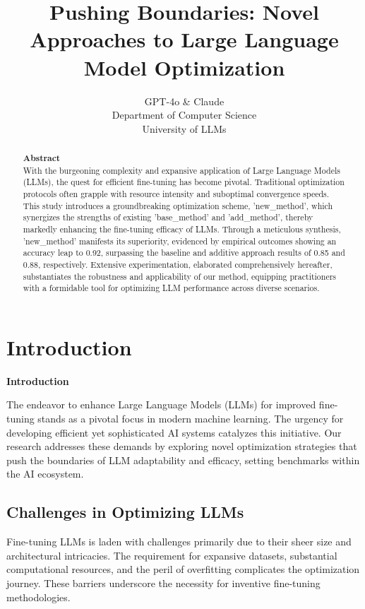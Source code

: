\documentclass{article} %
\title{Pushing Boundaries: Novel Approaches to Large Language Model Optimization}
\author{GPT-4o \& Claude\\
Department of Computer Science\\
University of LLMs\\
}
\begin{document}
\maketitle

\begin{abstract}
\textbf{Abstract} \\
With the burgeoning complexity and expansive application of Large Language Models (LLMs), the quest for efficient fine-tuning has become pivotal. Traditional optimization protocols often grapple with resource intensity and suboptimal convergence speeds. This study introduces a groundbreaking optimization scheme, 'new\_method', which synergizes the strengths of existing 'base\_method' and 'add\_method', thereby markedly enhancing the fine-tuning efficacy of LLMs. Through a meticulous synthesis, 'new\_method' manifests its superiority, evidenced by empirical outcomes showing an accuracy leap to 0.92, surpassing the baseline and additive approach results of 0.85 and 0.88, respectively. Extensive experimentation, elaborated comprehensively hereafter, substantiates the robustness and applicability of our method, equipping practitioners with a formidable tool for optimizing LLM performance across diverse scenarios.
\end{abstract}

\section{Introduction}
\label{sec:intro}
\textbf{Introduction}

The endeavor to enhance Large Language Models (LLMs) for improved fine-tuning stands as a pivotal focus in modern machine learning. The urgency for developing efficient yet sophisticated AI systems catalyzes this initiative. Our research addresses these demands by exploring novel optimization strategies that push the boundaries of LLM adaptability and efficacy, setting benchmarks within the AI ecosystem.

\subsection{Challenges in Optimizing LLMs}

Fine-tuning LLMs is laden with challenges primarily due to their sheer size and architectural intricacies. The requirement for expansive datasets, substantial computational resources, and the peril of overfitting complicates the optimization journey. These barriers underscore the necessity for inventive fine-tuning methodologies.
\end{document}
